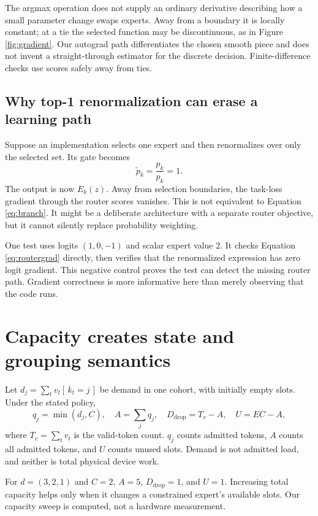 The argmax operation does not supply an ordinary derivative describing how a
small parameter change swaps experts. Away from a boundary it is locally
constant; at a tie the selected function may be discontinuous, as in
Figure \ref{fig:gradient}. Our autograd path differentiates the chosen smooth
piece and does not invent a straight-through estimator for the discrete
decision. Finite-difference checks use scores safely away from ties.

\subsection{Why top-1 renormalization can erase a learning path}
Suppose an implementation selects one expert and then renormalizes over only
the selected set. Its gate becomes
\begin{equation}
\widetilde p_k=\frac{p_k}{p_k}=1.
\end{equation}
The output is now $E_k(z)$. Away from selection boundaries, the task-loss
gradient through the router scores vanishes. This is not equivalent to
Equation \ref{eq:branch}. It might be a deliberate architecture with a separate
router objective, but it cannot silently replace probability weighting.

One test uses logits $(1,0,-1)$ and scalar expert value $2$. It checks
Equation \ref{eq:routergrad} directly, then verifies that the renormalized
expression has zero logit gradient. This negative control proves the test can
detect the missing router path. Gradient correctness is more informative here
than merely observing that the code runs.

\section{Capacity creates state and grouping semantics}
Let $d_j=\sum_t v_t[\,k_t=j\,]$ be demand in one cohort, with initially empty
slots. Under the stated policy,
\begin{equation}
q_j=\min(d_j,C),\quad
A=\sum_j q_j,\quad
D_{\mathrm{drop}}=T_v-A,\quad
U=EC-A, \label{eq:account}
\end{equation}
where $T_v=\sum_t v_t$ is the valid-token count. $q_j$ counts admitted tokens,
$A$ counts all admitted tokens, and $U$ counts unused slots. Demand is not
admitted load, and neither is total physical device work.

For $d=(3,2,1)$ and $C=2$, $A=5$, $D_{\mathrm{drop}}=1$, and $U=1$.
Increasing total capacity helps only when it changes a constrained expert's
available slots. Our capacity sweep is computed, not a hardware measurement.
\begin{center}\end{center}

